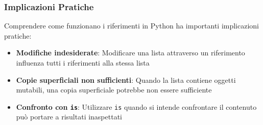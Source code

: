 \subsubsection{Implicazioni Pratiche}

Comprendere come funzionano i riferimenti in Python ha importanti implicazioni pratiche:

\begin{tcolorbox}[colback=red!5!white,colframe=red!75!black,title=Errori comuni con i riferimenti alle liste]
\begin{itemize}
    \item \textbf{Modifiche indesiderate}: Modificare una lista attraverso un riferimento influenza tutti i riferimenti alla stessa lista
    \item \textbf{Copie superficiali non sufficienti}: Quando la lista contiene oggetti mutabili, una copia superficiale potrebbe non essere sufficiente
    \item \textbf{Confronto con \texttt{is}}: Utilizzare \texttt{is} quando si intende confrontare il contenuto può portare a risultati inaspettati
\end{itemize}
\end{tcolorbox}